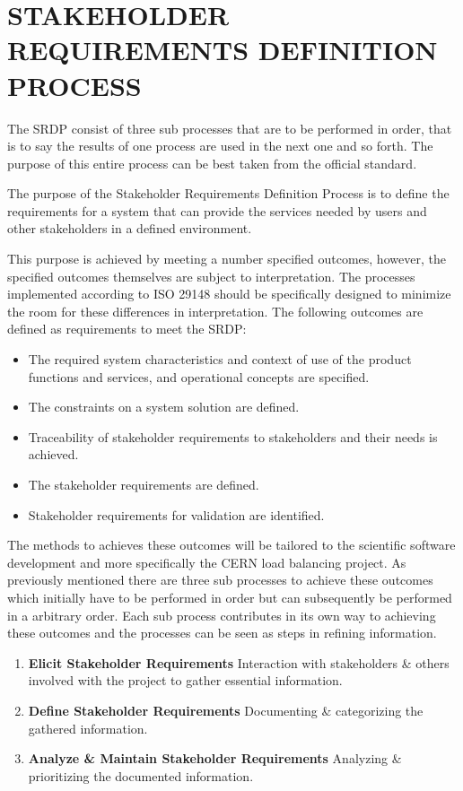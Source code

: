 \documentclass[conference]{IEEEtran}
\begin{document}
\section{STAKEHOLDER REQUIREMENTS DEFINITION PROCESS}
The SRDP consist of three sub processes that are to be performed in order, that is to say the results of one process are used in the next one and so forth. The purpose of this entire process can be best taken from the official standard.

\begin{displayquote}
The purpose of the Stakeholder Requirements Definition Process is to define the requirements for a system that can provide the services needed by users and other stakeholders in a defined environment.
\end{displayquote}

This purpose is achieved by meeting a number specified outcomes, however, the specified outcomes themselves are subject to interpretation. The processes implemented according to ISO 29148 should be specifically designed to minimize the room for these differences in interpretation. The following outcomes are defined as requirements to meet the SRDP:

\begin{itemize}
	\item The required system characteristics and context of use of the product functions and services, and
operational concepts are specified.
	\item The constraints on a system solution are defined.
	\item Traceability of stakeholder requirements to stakeholders and their needs is achieved.
	\item The stakeholder requirements are defined.
	\item Stakeholder requirements for validation are identified.
\end{itemize}

The methods to achieves these outcomes will be tailored to the scientific software development and more specifically the CERN load balancing project. As previously mentioned there are three sub processes to achieve these outcomes which initially have to be performed in order but can subsequently be performed in a arbitrary order. Each sub process contributes in its own way to achieving these outcomes and the processes can be seen as steps in refining information.
\begin{enumerate} 
	\item \textbf{Elicit Stakeholder Requirements} Interaction with stakeholders \& others involved with the project to gather essential information.
	\item \textbf{Define Stakeholder Requirements} Documenting \& categorizing the gathered information.
	\item \textbf{Analyze \& Maintain Stakeholder Requirements} Analyzing \& prioritizing the documented information.
\end{enumerate}
\end{document}
